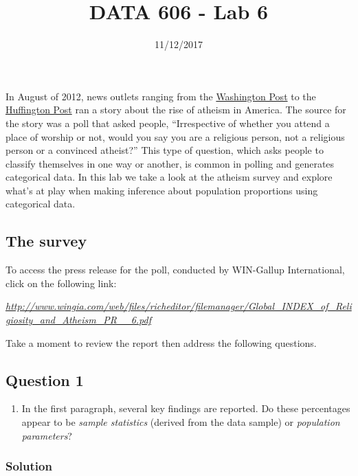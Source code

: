 \documentclass[]{article}
\title{DATA 606 - Lab 6}
\author{}
\date{11/12/2017}
\providecommand{\tightlist}{%
  \setlength{\itemsep}{0pt}\setlength{\parskip}{0pt}}
\begin{document}
\maketitle

In August of 2012, news outlets ranging from the
\href{http://www.washingtonpost.com/national/on-faith/poll-shows-atheism-on-the-rise-in-the-us/2012/08/13/90020fd6-e57d-11e1-9739-eef99c5fb285_story.html}{Washington
Post} to the
\href{http://www.huffingtonpost.com/2012/08/14/atheism-rise-religiosity-decline-in-america_n_1777031.html}{Huffington
Post} ran a story about the rise of atheism in America. The source for
the story was a poll that asked people, ``Irrespective of whether you
attend a place of worship or not, would you say you are a religious
person, not a religious person or a convinced atheist?'' This type of
question, which asks people to classify themselves in one way or
another, is common in polling and generates categorical data. In this
lab we take a look at the atheism survey and explore what's at play when
making inference about population proportions using categorical data.

\subsection{The survey}\label{the-survey}

To access the press release for the poll, conducted by WIN-Gallup
International, click on the following link:

\emph{\url{http://www.wingia.com/web/files/richeditor/filemanager/Global_INDEX_of_Religiosity_and_Atheism_PR__6.pdf}}

Take a moment to review the report then address the following questions.

\subsection{Question 1}\label{question-1}

\begin{enumerate}
\def\labelenumi{\arabic{enumi}.}
\tightlist
\item
  In the first paragraph, several key findings are reported. Do these
  percentages appear to be \emph{sample statistics} (derived from the
  data sample) or \emph{population parameters}?
\end{enumerate}

\subsubsection{Solution}\label{solution}
\end{document}
